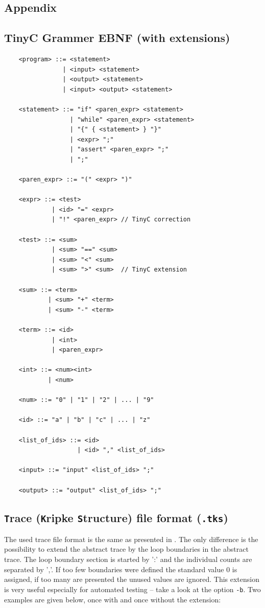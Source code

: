 \documentclass[english,a4paper,oneside]{article}%
\begin{document}
\newpage
\begin{appendix}
\section{Appendix}
\subsection{TinyC Grammer EBNF (with extensions)}
\label{grammer}
\begin{scriptsize}
\begin{lstlisting}
	<program> ::= <statement>
	            | <input> <statement>
	            | <output> <statement>
	            | <input> <output> <statement>

	<statement> ::= "if" <paren_expr> <statement>
	              | "while" <paren_expr> <statement>
	              | "{" { <statement> } "}"
	              | <expr> ";"
	              | "assert" <paren_expr> ";"
	              | ";"

	<paren_expr> ::= "(" <expr> ")"

	<expr> ::= <test>
	         | <id> "=" <expr>
	         | "!" <paren_expr> // TinyC correction

	<test> ::= <sum>
	         | <sum> "==" <sum>
	         | <sum> "<" <sum>
	         | <sum> ">" <sum>  // TinyC extension

	<sum> ::= <term>
	        | <sum> "+" <term>
	        | <sum> "-" <term>

	<term> ::= <id>
	         | <int>
	         | <paren_expr>

	<int> ::= <num><int>
	        | <num>

	<num> ::= "0" | "1" | "2" | ... | "9"

	<id> ::= "a" | "b" | "c" | ... | "z"

	<list_of_ids> ::= <id>
	                | <id> "," <list_of_ids>

	<input> ::= "input" <list_of_ids> ";"

	<output> ::= "output" <list_of_ids> ";"
\end{lstlisting}
\end{scriptsize}

\newpage
\subsection{\texttt{T}race (\texttt{K}ripke \texttt{S}tructure) file format (\texttt{.tks})}
\label{tks}
The used trace file format is the same as presented in \cite[p.~10]{cav}. The only difference is the possibility to extend the abstract trace by the loop boundaries in the abstract trace. The loop boundary section is started by ':' and the individual counts are separated by ','. If too few boundaries were defined the standard value $0$ is assigned, if too many are presented the unused values are ignored. This extension is very useful especially for automated testing -- take a look at the option \texttt{-b}. Two examples are given below, once with and once without the extension: 


\end{appendix}
\end{document}

